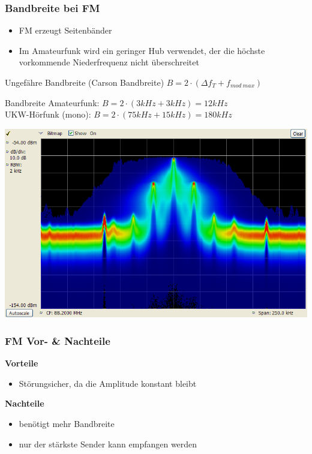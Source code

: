 \begin{frame}
\frametitle{Bandbreite bei FM}
\begin{itemize}
	\item FM erzeugt Seitenbänder
	\item Im Amateurfunk wird ein geringer Hub verwendet, der die höchste vorkommende Niederfrequenz nicht überschreitet
\end{itemize}
\begin{block}{Ungefähre Bandbreite (Carson Bandbreite)}
  $B = 2 \cdot (\Delta f_T + f_{mod~max})$
\end{block}
\begin{exampleblock}{Bandbreite}
  Amateurfunk: $B =2 \cdot (3kHz + 3kHz) = 12kHz$\\
  UKW-Hörfunk (mono): $B = 2 \cdot (75kHz + 15kHz) = 180kHz$
\end{exampleblock}
\end{frame}

\begin{frame}
  \begin{center}
    \includegraphics[width=1\textwidth,height=1\textheight,keepaspectratio]{e16/Dpx-fm-radio.png}
    \tiny \hyperlink{refs}{\cite{wc}}
  \end{center}
\end{frame}


\begin{frame}
\frametitle{FM Vor- \& Nachteile}
\textbf{\Large{Vorteile}}
\begin{itemize}
	\item Störungsicher, da die Amplitude konstant bleibt 
\end{itemize}
\vspace{1cm}
\textbf{\Large{Nachteile}}
\begin{itemize}
	\item benötigt mehr Bandbreite
	\item nur der stärkste Sender kann empfangen werden
\end{itemize}
\end{frame}

